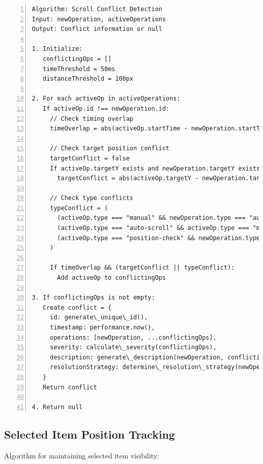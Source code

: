 \documentclass[10pt]{article}
\begin{document}
\begin{Verbatim}[frame=lines, numbers=left, tabsize=2, fontsize=\small, xleftmargin=1em, xrightmargin=1em, breaklines=true]
Algorithm: Scroll Conflict Detection
Input: newOperation, activeOperations
Output: Conflict information or null

1. Initialize:
   conflictingOps = []
   timeThreshold = 50ms
   distanceThreshold = 100px

2. For each activeOp in activeOperations:
   If activeOp.id !== newOperation.id:
     // Check timing overlap
     timeOverlap = abs(activeOp.startTime - newOperation.startTime) < timeThreshold
     
     // Check target position conflict
     targetConflict = false
     If activeOp.targetY exists and newOperation.targetY exists:
       targetConflict = abs(activeOp.targetY - newOperation.targetY) > 100px
     
     // Check type conflicts
     typeConflict = (
       (activeOp.type === "manual" && newOperation.type === "auto-scroll") ||
       (activeOp.type === "auto-scroll" && activeOp.type === "manual") ||
       (activeOp.type === "position-check" && newOperation.type !== "position-check")
     )
     
     If timeOverlap && (targetConflict || typeConflict):
       Add activeOp to conflictingOps

3. If conflictingOps is not empty:
   Create conflict = {
     id: generate\_unique\_id(),
     timestamp: performance.now(),
     operations: [newOperation, ...conflictingOps],
     severity: calculate\_severity(conflictingOps),
     description: generate\_description(newOperation, conflictingOps),
     resolutionStrategy: determine\_resolution\_strategy(newOperation, conflictingOps)
   }
   Return conflict

4. Return null
\end{Verbatim}

\subsection{Selected Item Position Tracking}

Algorithm for maintaining selected item visibility:
\end{document}
